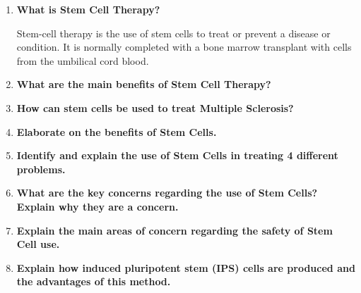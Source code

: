 \documentclass[a4paper]{article}
\begin{document}
\begin{enumerate}
    \item \textbf{What is Stem Cell Therapy? \cite{Mahla2016}}
   
Stem-cell therapy is the use of stem cells to treat or prevent a disease or condition. It is normally completed with a bone marrow transplant with cells from the umbilical cord blood. 

    \item \textbf{What are the main benefits of Stem Cell Therapy?}


    \item \textbf{How can stem cells be used to treat Multiple Sclerosis?}


    \item \textbf{Elaborate on the benefits of Stem Cells.}


    \item \textbf{Identify and explain the use of Stem Cells in treating 4 different problems.}


    \item \textbf{What are the key concerns regarding the use of Stem Cells? Explain why they are a concern.}


    \item \textbf{Explain the main areas of concern regarding the safety of Stem Cell use.}


    \item \textbf{Explain how induced pluripotent stem (IPS) cells are produced and the advantages of this method.}


\end{enumerate}

\medskip



\end{document}
